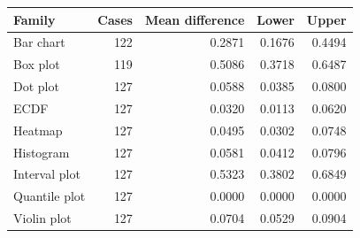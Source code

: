 \begin{tabular}{lrrrr}\toprule
Family & Cases & Mean difference & Lower & Upper\\\midrule
Bar chart & 122 & 0.2871 & 0.1676 & 0.4494\\
Box plot & 119 & 0.5086 & 0.3718 & 0.6487\\
Dot plot & 127 & 0.0588 & 0.0385 & 0.0800\\
ECDF & 127 & 0.0320 & 0.0113 & 0.0620\\
Heatmap & 127 & 0.0495 & 0.0302 & 0.0748\\
Histogram & 127 & 0.0581 & 0.0412 & 0.0796\\
Interval plot & 127 & 0.5323 & 0.3802 & 0.6849\\
Quantile plot & 127 & 0.0000 & 0.0000 & 0.0000\\
Violin plot & 127 & 0.0704 & 0.0529 & 0.0904\\
\bottomrule\end{tabular}

